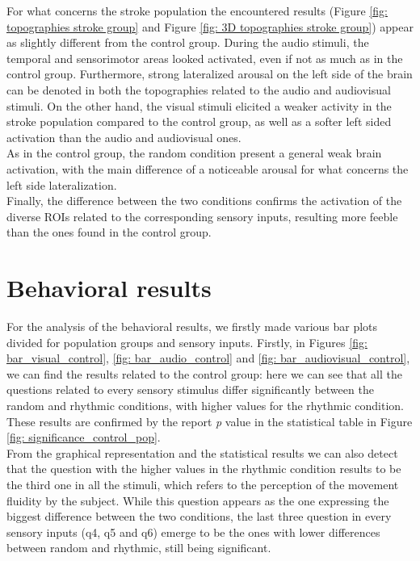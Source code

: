 For what concerns the stroke population the encountered results (Figure \ref{fig: topographies stroke group} and Figure \ref{fig: 3D topographies stroke group}) appear as slightly different from the control group. During the audio stimuli, the temporal and sensorimotor areas looked activated, even if not as much as in the control group. Furthermore, strong lateralized arousal on the left side of the brain can be denoted in both the topographies related to the audio and audiovisual stimuli. On the other hand, the visual stimuli elicited a weaker activity in the stroke population compared to the control group, as well as a softer left sided activation than the audio and audiovisual ones. \\
As in the control group, the random condition present a general weak brain activation, with the main difference of a noticeable arousal for what concerns the left side lateralization. \\
Finally, the difference between the two conditions confirms the activation of the diverse ROIs related to the corresponding sensory inputs, resulting more feeble than the ones found in the control group. 

\section{Behavioral results}
For the analysis of the behavioral results, we firstly made various bar plots divided for population groups and sensory inputs. Firstly, in Figures \ref{fig: bar_visual_control}, \ref{fig: bar_audio_control} and \ref{fig: bar_audiovisual_control}, we can find the results related to the control group: here we can see that all the questions related to every sensory stimulus differ significantly between the random and rhythmic conditions, with higher values for the rhythmic condition. These results are confirmed by the report \textit{p} value in the statistical table in Figure \ref{fig: significance_control_pop}. \\
From the graphical representation and the statistical results we can also detect that the question with the higher values in the rhythmic condition results to be the third one in all the stimuli, which refers to the perception of the movement fluidity by the subject. While this question appears as the one expressing the biggest difference between the two conditions, the last three question in every sensory inputs (q4, q5 and q6) emerge to be the ones with lower differences between random and rhythmic, still being significant.

